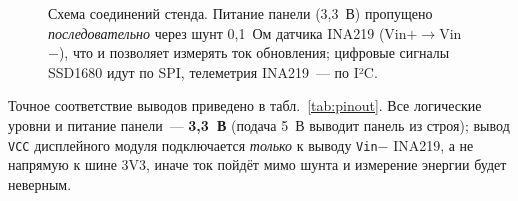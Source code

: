 \begin{figure}[H]
    \caption{Схема соединений стенда. Питание панели (3,3~В) пропущено
        \emph{последовательно} через шунт 0,1~Ом датчика INA219 (Vin$+\to$Vin$-$),
        что и позволяет измерять ток обновления; цифровые сигналы SSD1680 идут по
        SPI, телеметрия INA219~--- по I²C.}
    \label{fig:wiring}
\end{figure}

Точное соответствие выводов приведено в табл.~\ref{tab:pinout}. Все логические
уровни и питание панели~--- \textbf{3,3~В} (подача 5~В выводит панель из строя);
вывод \texttt{VCC} дисплейного модуля подключается \emph{только} к выводу
\texttt{Vin$-$} INA219, а не напрямую к шине 3V3, иначе ток пойдёт мимо шунта и
измерение энергии будет неверным.

